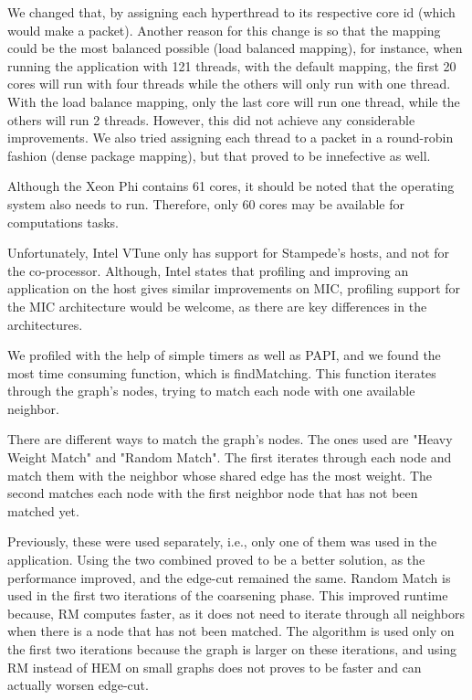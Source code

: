 \documentclass[abstract=on,9pt,twocolumn]{scrartcl}
\begin{document}
We changed that, by assigning each hyperthread to its respective core id (which would make a packet).
Another reason for this change is so that the mapping could be
the most balanced possible (load balanced mapping), for instance,
when running the application with 121 threads, with the default mapping,
the first 20 cores will run with four threads while the others will only
run with one thread. With the load balance mapping, only the last core
will run one thread, while the others will run 2 threads. However, this did not achieve any considerable improvements. We also tried assigning each thread to a packet in a round-robin fashion (dense package mapping), but that proved to be innefective as well.

Although the Xeon Phi contains 61 cores, it should be noted that the
operating system also needs to run. Therefore, only 60 cores may be
available for computations tasks.


Unfortunately, Intel VTune only has support for Stampede's hosts, and
not for the co-processor. Although, Intel states that profiling and
improving an application on the host gives similar improvements on MIC,
profiling support for the MIC architecture would be welcome, as there are key
differences in the architectures.

We profiled with the help of simple timers as well as PAPI, and we
found the most time consuming function, which is findMatching. This
function iterates through the graph's nodes, trying to match each node
with one available neighbor.


There are different ways to match the graph's nodes. The ones used are
"Heavy Weight Match" and "Random Match". The first iterates through each
node and match them with the neighbor whose shared edge has the most
weight. The second matches each node with the first neighbor node that
has not been matched yet.

Previously, these were used separately, i.e., only one of them was
used in the application. Using the two combined proved to be a better
solution, as the performance improved, and the edge-cut remained the
same. Random Match is used in the first two iterations of the coarsening
phase. This improved runtime because, RM computes faster, as it does not
need to iterate through all neighbors when there is a node that has not
been matched. The algorithm is used only on the first two iterations
because the graph is larger on these iterations, and using RM instead of
HEM on small graphs does not proves to be faster and can actually worsen
edge-cut.
\end{document}
